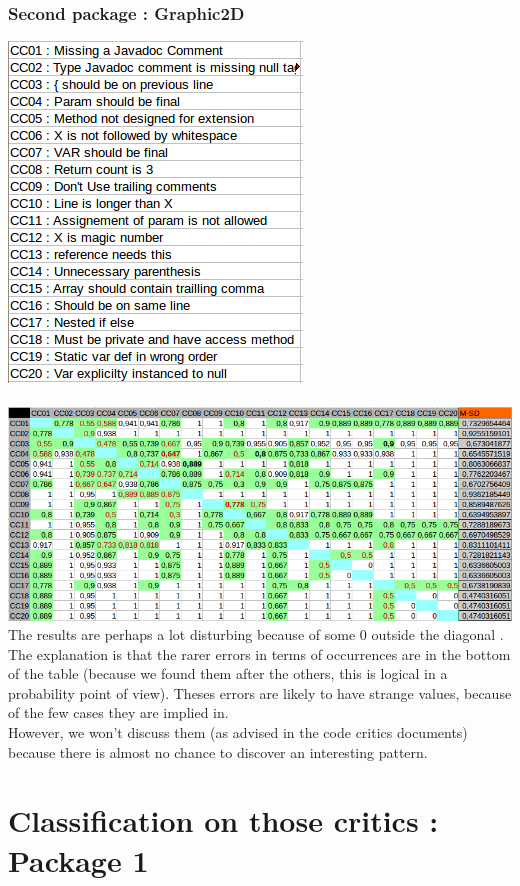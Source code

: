 \documentclass{article}
\begin{document}
\subsubsection{Second package : Graphic2D}
\includegraphics[scale=0.5]{names01.png} \\ \\
\includegraphics[scale=0.5]{01.png} \\

The results are perhaps a lot disturbing because of some 0 outside the diagonal .\\

The explanation is that the rarer errors in terms of occurrences are in the bottom of the table (because we found them after the others, this is logical in a probability point of view). Theses errors are likely to have strange values, because of the few cases they are implied in. \\
However, we won't discuss them (as advised in the code critics documents) because there is almost no chance to discover an interesting pattern.


\section{Classification on those critics : Package 1}
\end{document}
